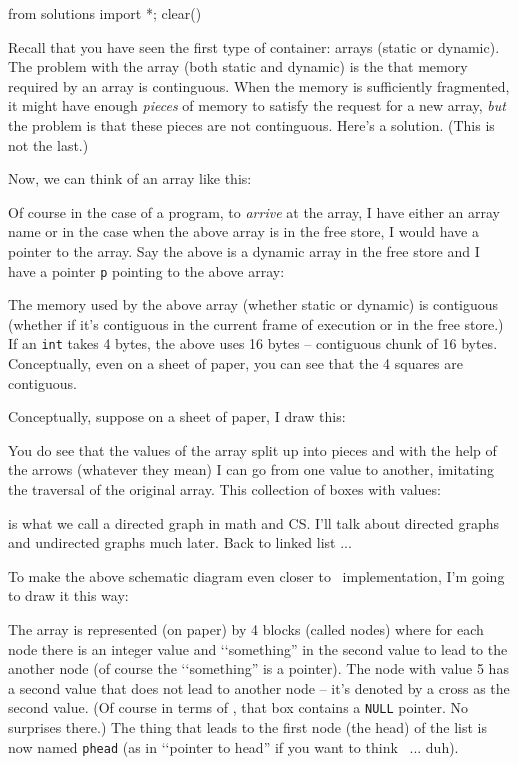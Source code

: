 \begin{python0}
from solutions import *; clear()
\end{python0}

Recall that you have
seen the first type of container: arrays (static or dynamic).
The problem with the array (both static and dynamic)
is the that memory required by an array is continguous.
When the memory is sufficiently fragmented,
it might have enough \textit{pieces} of memory to satisfy the
request for a new array, \textit{but} the problem
is that these pieces are not continguous.
Here's a solution.
(This is not the last.)

Now, we can think of an array like this:



Of course in the case of a program, to \textit{arrive} at the
array, I have either an array name or in the case when the
above array is in the free store, I would have a pointer to the array.
Say the above is a dynamic array in the free store and I have a pointer
\verb!p! pointing to the above array:



The memory used by the above array (whether static or dynamic)
is contiguous (whether if it's contiguous in the current frame of
execution or in the free store.)
If an \verb!int! takes 4 bytes, the above uses 16 bytes --
contiguous chunk of 16 bytes.
Conceptually, even on a sheet of paper, you can see that the 4 squares
are contiguous.

Conceptually, suppose on a sheet of paper, I draw this:



You do see that the values of the array split up into pieces and
with the help of the arrows (whatever they mean) I can go from one value
to another, imitating the traversal of the original array.
This collection of boxes with values:



is what we call a directed graph in math and CS.
I'll talk about directed graphs and undirected graphs much later.
Back to linked list ...

To make the above schematic diagram even closer to
\cpp\ implementation,
I'm going to draw it this way:



The array is represented (on paper) by 4 blocks (called nodes)
where for each node there is an integer value and \lq\lq something''
in the second value to lead to the another node
(of course the \lq\lq something'' is a pointer).
The node with value 5 has a second value that does not lead to
another node -- it's denoted by a cross as the second value.
(Of course in terms of \cpp, that box contains a \verb!NULL! pointer.
No surprises there.)
The thing that leads to the first node (the head) of the list
is now named \verb!phead! (as in \lq\lq pointer to head'' if you
want to think \cpp\ ... duh).

